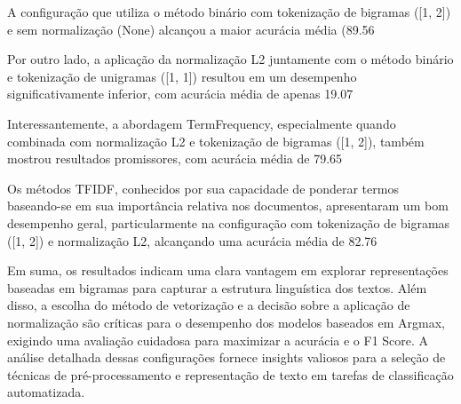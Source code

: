 A configuração que utiliza o método binário com tokenização de bigramas ([1, 2]) e sem normalização (None) alcançou a maior acurácia média (89.56%

Por outro lado, a aplicação da normalização L2 juntamente com o método binário e tokenização de unigramas ([1, 1]) resultou em um desempenho significativamente inferior, com acurácia média de apenas 19.07%

Interessantemente, a abordagem TermFrequency, especialmente quando combinada com normalização L2 e tokenização de bigramas ([1, 2]), também mostrou resultados promissores, com acurácia média de 79.65%

Os métodos TFIDF, conhecidos por sua capacidade de ponderar termos baseando-se em sua importância relativa nos documentos, apresentaram um bom desempenho geral, particularmente na configuração com tokenização de bigramas ([1, 2]) e normalização L2, alcançando uma acurácia média de 82.76%

Em suma, os resultados indicam uma clara vantagem em explorar representações baseadas em bigramas para capturar a estrutura linguística dos textos. Além disso, a escolha do método de vetorização e a decisão sobre a aplicação de normalização são críticas para o desempenho dos modelos baseados em Argmax, exigindo uma avaliação cuidadosa para maximizar a acurácia e o F1 Score. A análise detalhada dessas configurações fornece insights valiosos para a seleção de técnicas de pré-processamento e representação de texto em tarefas de classificação automatizada.

